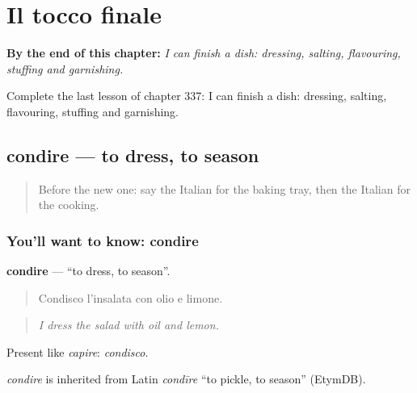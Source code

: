 
\chapter{Il tocco finale}
\label{ch:it-il-tocco-finale}

\begin{chapteropening}
\textbf{By the end of this chapter:} \emph{I can finish a dish: dressing, salting, flavouring, stuffing and garnishing.}

Complete the last lesson of chapter 337: I can finish a dish: dressing, salting, flavouring, stuffing and garnishing.
\end{chapteropening}

\section[condire]{condire — to dress, to season}

\label{lesson:IT-C337-condire}



\begin{quote}
Before the new one: say the Italian for the baking tray, then the Italian for the cooking.
\end{quote}

\subsection*{You'll want to know: condire}
\textbf{condire} — \textquotedblleft{}to dress, to season\textquotedblright{}.

\begin{quote}
Condisco l'insalata con olio e limone.
\end{quote}

\begin{quote}
\emph{I dress the salad with oil and lemon.}
\end{quote}

Present like \emph{capire}: \emph{condisco}.

\begin{cousinweb}
\emph{condire} is inherited from Latin \emph{condīre} \textquotedblleft{}to pickle, to season\textquotedblright{} (EtymDB).
\end{cousinweb}

